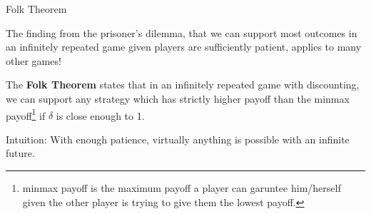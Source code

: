 \documentclass[aspectratio=169]{beamer}
\begin{document}
\begin{frame}{Folk Theorem}

The finding from the prisoner's dilemma, that we can support most outcomes in an infinitely repeated game given players are sufficiently patient, applies to many other games!
\begin{theorem}
The \textbf{Folk Theorem} states that in an infinitely repeated game with discounting, we can support any strategy which has strictly higher payoff than the minmax payoff\footnote{minmax payoff is the maximum payoff a player can garuntee him/herself given the other player is trying to give them the lowest payoff.} if $\delta$ is close enough to 1.
\end{theorem}
Intuition: With enough patience, virtually anything is possible with an infinite future.

\end{frame}
\end{document}
